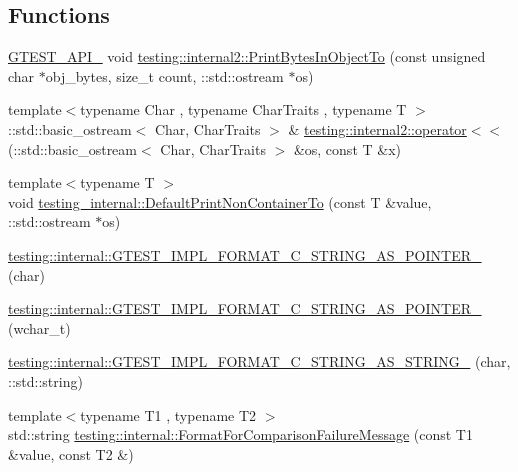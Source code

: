 \subsection*{Functions}
\begin{DoxyCompactItemize}
\item 
\mbox{\hyperlink{gtest-port_8h_aa73be6f0ba4a7456180a94904ce17790}{G\+T\+E\+S\+T\+\_\+\+A\+P\+I\+\_\+}} void \mbox{\hyperlink{namespacetesting_1_1internal2_a9fbf8e07c0f94dc74d6ef5e56cd3c553}{testing\+::internal2\+::\+Print\+Bytes\+In\+Object\+To}} (const unsigned char $\ast$obj\+\_\+bytes, size\+\_\+t count, \+::std\+::ostream $\ast$os)
\item 
{\footnotesize template$<$typename Char , typename Char\+Traits , typename T $>$ }\\\+::std\+::basic\+\_\+ostream$<$ Char, Char\+Traits $>$ \& \mbox{\hyperlink{namespacetesting_1_1internal2_a07dbe129beb8952074f04b599dfce39b}{testing\+::internal2\+::operator$<$$<$}} (\+::std\+::basic\+\_\+ostream$<$ Char, Char\+Traits $>$ \&os, const T \&x)
\item 
{\footnotesize template$<$typename T $>$ }\\void \mbox{\hyperlink{namespacetesting__internal_a3f49d3d0c996242f9d383c850097a656}{testing\+\_\+internal\+::\+Default\+Print\+Non\+Container\+To}} (const T \&value, \+::std\+::ostream $\ast$os)
\item 
\mbox{\hyperlink{namespacetesting_1_1internal_a3682f962ae0ec1c0eca6444ca0a09e91}{testing\+::internal\+::\+G\+T\+E\+S\+T\+\_\+\+I\+M\+P\+L\+\_\+\+F\+O\+R\+M\+A\+T\+\_\+\+C\+\_\+\+S\+T\+R\+I\+N\+G\+\_\+\+A\+S\+\_\+\+P\+O\+I\+N\+T\+E\+R\+\_\+}} (char)
\item 
\mbox{\hyperlink{namespacetesting_1_1internal_a85e08f00d443221e529a0a85a90fbaeb}{testing\+::internal\+::\+G\+T\+E\+S\+T\+\_\+\+I\+M\+P\+L\+\_\+\+F\+O\+R\+M\+A\+T\+\_\+\+C\+\_\+\+S\+T\+R\+I\+N\+G\+\_\+\+A\+S\+\_\+\+P\+O\+I\+N\+T\+E\+R\+\_\+}} (wchar\+\_\+t)
\item 
\mbox{\hyperlink{namespacetesting_1_1internal_aeac30230dcc362221bdd07d61eaa4ec1}{testing\+::internal\+::\+G\+T\+E\+S\+T\+\_\+\+I\+M\+P\+L\+\_\+\+F\+O\+R\+M\+A\+T\+\_\+\+C\+\_\+\+S\+T\+R\+I\+N\+G\+\_\+\+A\+S\+\_\+\+S\+T\+R\+I\+N\+G\+\_\+}} (char, \+::std\+::string)
\item 
{\footnotesize template$<$typename T1 , typename T2 $>$ }\\std\+::string \mbox{\hyperlink{namespacetesting_1_1internal_a91ab078f10adc669f09b7f604975c518}{testing\+::internal\+::\+Format\+For\+Comparison\+Failure\+Message}} (const T1 \&value, const T2 \&)

\end{DoxyCompactItemize}
